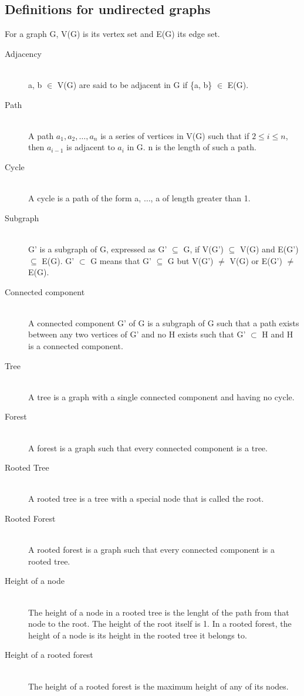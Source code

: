 \subsection{Definitions for undirected graphs}
For a graph G, V(G) is its vertex set and E(G) its edge set.
\begin{description}
 \item[Adjacency] \hfill \\
  a, b $\in$ V(G) are said to be adjacent in G if \{a, b\} $\in$ E(G).
 \item[Path] \hfill \\
  A path $a_1, a_2, \ldots, a_n$ is a series of vertices in V(G) such that if $2 \leq i \leq n$, then $a_{i-1}$ is adjacent to $a_i$ in G. n is the length of such a path.
 \item[Cycle] \hfill \\
  A cycle is a path of the form a, $\ldots$, a of length greater than 1.
 \item[Subgraph] \hfill \\
 G' is a subgraph of G, expressed as G' $\subseteq$ G, if V(G') $\subseteq$ V(G) and E(G') $\subseteq$ E(G). G' $\subset$ G means that G' $\subseteq$ G but V(G') $\neq$ V(G) or E(G') $\neq$ E(G).
 \item[Connected component] \hfill \\
  A connected component G' of G is a subgraph of G such that a path exists between any two vertices of G' and no H exists such that G' $\subset$ H and H is a connected component.
  \item[Tree] \hfill \\ 
  A tree is a graph with a single connected component and having no cycle.
  \item[Forest] \hfill \\
  A forest is a graph such that every connected component is a tree.
  \item[Rooted Tree] \hfill \\ 
  A rooted tree is a tree with a special node that is called the root.
  \item[Rooted Forest] \hfill \\ 
  A rooted forest is a graph such that every connected component is a rooted tree.
  \item[Height of a node] \hfill \\ 
  The height of a node in a rooted tree is the lenght of the path from that node to the root. The height of the root itself is 1. In a rooted forest, the height of a node is its height in the rooted tree it belongs to.
  \item[Height of a rooted forest] \hfill \\ 
  The height of a rooted forest is the maximum height of any of its nodes.
\end{description}

